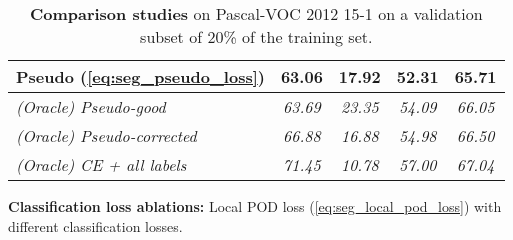 \begin{table}
\begin{subtable}{\textwidth}
\begin{tabular}{@{}l|cccc@{}}
            Pseudo (\autoref{eq:seg_pseudo_loss}) & \textbf{63.06} & \textbf{17.92}    & \textbf{52.31} & \textbf{65.71} \\
            \midrule
            \textit{(Oracle) Pseudo-good}         & \textit{63.69} & \textit{23.35}    & \textit{54.09} & \textit{66.05} \\
            \textit{(Oracle) Pseudo-corrected}    & \textit{66.88} & \textit{16.88}    & \textit{54.98} & \textit{66.50} \\
            \textit{(Oracle) CE + all labels}     & \textit{71.45} & \textit{10.78}    & \textit{57.00} & \textit{67.04} \\
            \bottomrule
        \end{tabular}
        \caption{\textbf{Classification loss ablations:} Local POD loss (\autoref{eq:seg_local_pod_loss}) with different classification losses.}
        \label{tab:seg_ablation_classif}
    \end{subtable}
    \caption{\textbf{Comparison studies} on Pascal-VOC 2012 15-1 on a validation subset of 20\% of the training set.}
    \label{tab:seg_ablation_distill_classif}
\end{table}



